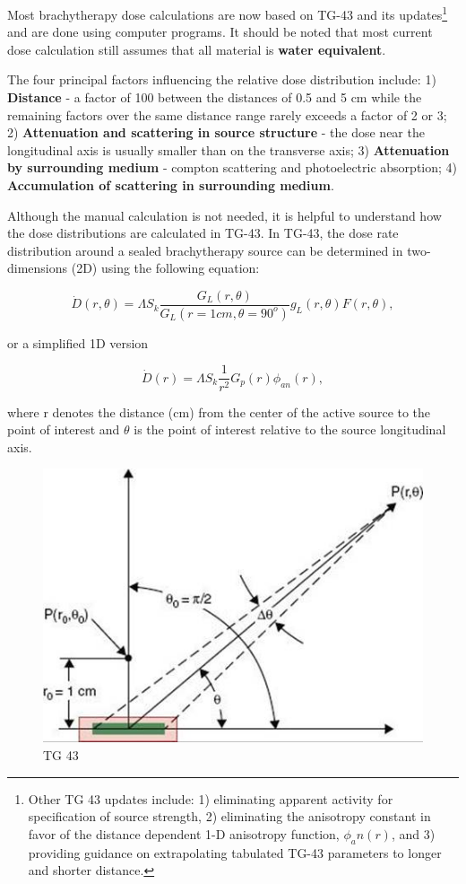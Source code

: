 \documentclass[]{book}
\let\rmarkdownfootnote\footnote%
\def\footnote{\protect\rmarkdownfootnote}
\theoremstyle{definition}
\theoremstyle{definition}
\theoremstyle{definition}
\theoremstyle{remark}
\begin{document}
Most brachytherapy dose calculations are now based on TG-43 and its
updates\footnote{Other TG 43 updates include: 1) eliminating apparent
  activity for specification of source strength, 2) eliminating the
  anisotropy constant in favor of the distance dependent 1-D anisotropy
  function, \(\phi_an(r)\), and 3) providing guidance on extrapolating
  tabulated TG-43 parameters to longer and shorter distance.} and are
done using computer programs. It should be noted that most current dose
calculation still assumes that all material is \textbf{water
equivalent}.

The four principal factors influencing the relative dose distribution
include: 1) \textbf{Distance} - a factor of 100 between the distances of
0.5 and 5 cm while the remaining factors over the same distance range
rarely exceeds a factor of 2 or 3; 2) \textbf{Attenuation and scattering
in source structure} - the dose near the longitudinal axis is usually
smaller than on the transverse axis; 3) \textbf{Attenuation by
surrounding medium} - compton scattering and photoelectric absorption;
4) \textbf{Accumulation of scattering in surrounding medium}.

Although the manual calculation is not needed, it is helpful to
understand how the dose distributions are calculated in TG-43. In TG-43,
the dose rate distribution around a sealed brachytherapy source can be
determined in two-dimensions (2D) using the following equation:

\begin{equation}
   \dot D(r, \theta) = \Lambda S_k \frac{G_L(r, \theta)}{G_L(r=1cm,\theta=90^o)} g_L(r, \theta) F(r,\theta),
   \label{eq:tg43}
\end{equation}

or a simplified 1D version

\begin{equation}
   \dot D(r) = \Lambda S_k \frac{1}{r^2} G_p(r)\phi_{an}(r),
   \label{eq:tg43-1D}
\end{equation}

where r denotes the distance (cm) from the center of the active source
to the point of interest and \(\theta\) is the point of interest
relative to the source longitudinal axis.

\begin{figure}
\centering
\includegraphics{figures/tg43.jpg}
\caption{TG 43}
\end{figure}
\end{document}
